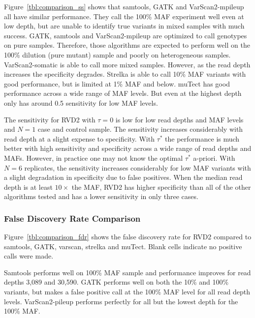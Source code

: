 \documentclass{bioinfo}
\begin{document}



Figure~\ref{tbl:comparison_ss} shows that samtools, GATK and VarScan2-mpileup all have similar performance. They call the 100\% MAF experiment well even at low depth, but are unable to identify true variants in mixed samples with much success. GATK, samtools and VarScan2-mpileup are optimized to call genotypes on pure samples. Therefore, those algorithms are expected to perform well on the 100\% dilution (pure mutant) sample and poorly on heterogeneous samples. VarScan2-somatic is able to call more mixed samples. However, as the read depth increases the specificity degrades. Strelka is able to call 10\% MAF variants with good performance, but is limited at 1\% MAF and below. muTect has good performance across a wide range of MAF levels. But even at the highest depth only has around 0.5 sensitivity for low MAF levels.


The sensitivity for RVD2 with $\tau=0$ is low for low read depths and MAF levels and $N=1$ case and control sample. The sensitivity increases considerably with read depth at a slight expense to specificity. With $\tau^*$ the performance is much better with high sensitivity and specificity across a wide range of read depths and MAFs. However, in practice one may not know the optimal $\tau^*$ a-priori. With $N=6$ replicates, the sensitivity increases considerably for low MAF variants with a slight degradation in specificity due to false positives. When the median read depth is at least $10\times$ the MAF, RVD2 has higher specificity than all of the other algorithms tested and has a lower sensitivity in only three cases.

\subsubsection*{False Discovery Rate Comparison}
Figure~\ref{tbl:comparison_fdr} shows the false discovery rate for RVD2 compared to samtools, GATK, varscan, strelka and muTect. Blank cells indicate no positive calls were made.

Samtools performs well on 100\% MAF sample and performance improves for read depths 3,089 and 30,590. GATK performs well on both the 10\% and 100\% variants, but makes a false positive call at the 100\% MAF level for all read depth levels. VarScan2-pileup performs perfectly for all but the lowest depth for the 100\% MAF.
\end{document}
